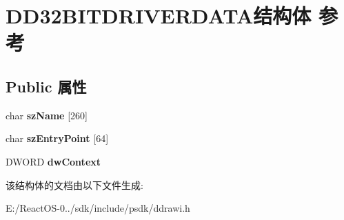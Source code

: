 \hypertarget{struct_d_d32_b_i_t_d_r_i_v_e_r_d_a_t_a}{}\section{D\+D32\+B\+I\+T\+D\+R\+I\+V\+E\+R\+D\+A\+T\+A结构体 参考}
\label{struct_d_d32_b_i_t_d_r_i_v_e_r_d_a_t_a}
\subsection*{Public 属性}
\begin{DoxyCompactItemize}
\item 
\mbox{\label{struct_d_d32_b_i_t_d_r_i_v_e_r_d_a_t_a_a3273a38cadf82e873247608009955b28}} 
char {\bfseries sz\+Name} \mbox{[}260\mbox{]}
\item 
\mbox{\label{struct_d_d32_b_i_t_d_r_i_v_e_r_d_a_t_a_a0306669cae647f8ff927e87aca63c808}} 
char {\bfseries sz\+Entry\+Point} \mbox{[}64\mbox{]}
\item 
\mbox{\label{struct_d_d32_b_i_t_d_r_i_v_e_r_d_a_t_a_a3b43f26a1b4ced0858b1315265ebb0cf}} 
D\+W\+O\+RD {\bfseries dw\+Context}
\end{DoxyCompactItemize}


该结构体的文档由以下文件生成\+:\begin{DoxyCompactItemize}
\item 
E\+:/\+React\+O\+S-\/0../sdk/include/psdk/ddrawi.\+h\end{DoxyCompactItemize}
